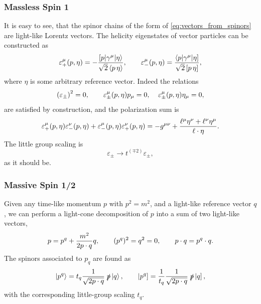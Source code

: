 \subsubsection{Massless Spin 1}

It is easy to see, that the spinor chains of the form of \cref{eq:vectors_from_spinors} are light-like Lorentz vectors.
The helicity eigenstates of vector particles can be constructed as
\begin{equation}
  \varepsilon_+^\mu(p,\eta) = -\frac{\sbraket(p,\gamma^\mu,\eta)}{\sqrt{2} \spaa(p,\eta)}, \qquad \varepsilon_-^\mu(p,\eta) = \frac{\brasket(p,\gamma^\mu,\eta)}{\sqrt{2} \spbb(p,\eta)},
\end{equation}
where $\eta$ is some arbitrary reference vector. Indeed
the relations 
\begin{equation}
  \qty(\varepsilon_{\pm})^2 =0, \qquad
  \varepsilon^{\mu}_{\pm}(p,\eta) p_\mu = 0,
  \;\;\;\;
  \varepsilon^{\mu}_{\pm}(p,\eta) \eta_\mu = 0,
\end{equation}
are satisfied by construction, and the polarization sum is
\begin{equation}
  \varepsilon^{\mu}_{+}(p,\eta)\varepsilon^{\nu}_{-}(p,\eta) + \varepsilon^{\mu}_{-}(p,\eta)\varepsilon^{\nu}_{+}(p,\eta) = -g^{\mu\nu} + \frac{\ell^\mu \eta^\nu + \ell^\nu \eta^\mu}{\sp(\ell,\eta)}.
\end{equation}
The little group scaling is
\begin{equation}
  \varepsilon_{\pm} \longrightarrow t^{(\mp 2)} \varepsilon_{\pm},
\end{equation}
as it should be.


\subsubsection{Massive Spin 1/2}

Given any time-like momentum $p$ with $p^2 = m^2$, and a light-like reference vector $q$, we can perform a light-cone decomposition of $p$ 
into a sum of two light-like vectors,
\begin{equation}
  p = p^q + \frac{m^2}{2 \sp(p,q)} q, \qquad (p^q)^2 = q^2 = 0, \qquad \sp(p,q) = \sp(p^q,q).
\end{equation}
The spinors associated to $p_q$ are found as
\begin{equation}
  \ket{p^q} = t_q \frac{1}{\sqrt{2\sp(p,q)}} \; \slashed{p} \ket{q},  \qquad \sket{p^q} = \frac{1}{t_q} \frac{1}{\sqrt{2\sp(p,q)}} \; \slashed{p} \sket{q},
\end{equation}
with the corresponding little-group scaling $t_q$.

